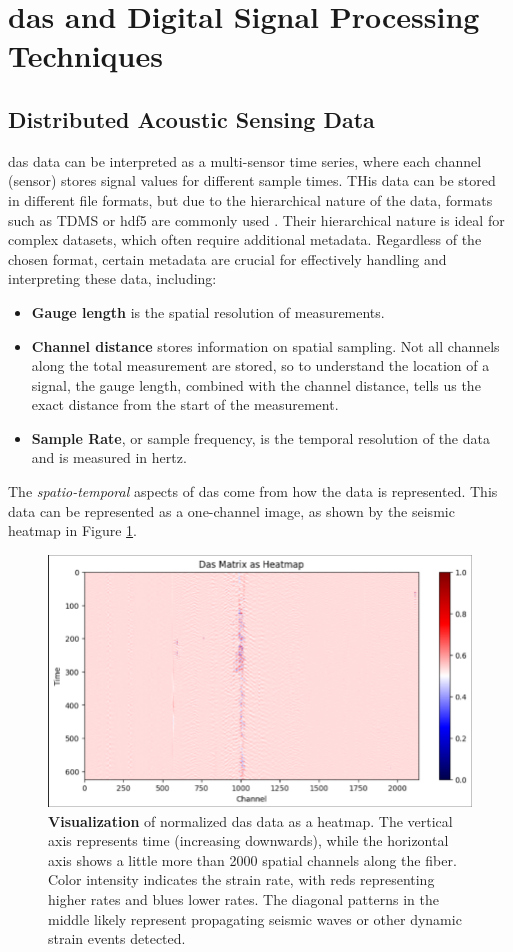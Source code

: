 \section{\acrshort{das} and Digital Signal Processing Techniques}
\label{back:dsp}

\subsection{Distributed Acoustic Sensing Data}
\label{back:das}

\acrshort{das} data can be interpreted as a multi-sensor time series, where each channel (sensor) stores signal values for different sample times. THis data can be stored in different file formats, but due to the hierarchical nature of the data, formats such as TDMS \cite{10.1145/800196.805973} or \acrshort{hdf5} \cite{koranne2011hierarchical} are commonly used \cite{spica2022pubdas}. Their hierarchical nature is ideal for complex datasets, which often require additional metadata. Regardless of the chosen format, certain metadata are crucial for effectively handling and interpreting these data, including:
\begin{itemize}
    \item \textbf{Gauge length} is the spatial resolution of measurements.
    \item \textbf{Channel distance} stores information on spatial sampling. Not all channels along the total measurement are stored, so to understand the location of a signal, the gauge length, combined with the channel distance, tells us the exact distance from the start of the measurement.
    \item \textbf{Sample Rate}, or sample frequency, is the temporal resolution of the data and is measured in hertz. 
\end{itemize}
%
The \textit{spatio-temporal} aspects of \acrshort{das} come from how the data is represented. This data can be represented as a one-channel image, as shown by the seismic heatmap in Figure \ref{fig:dasframe-ex}. 
%
\begin{figure}[!h]
    \centering
    \includegraphics[width=0.7\linewidth]{figures/das_example.png}
    \caption{\textbf{Visualization} of normalized \acrshort{das} data as a heatmap. The vertical axis represents time (increasing downwards), while the horizontal axis shows a little more than 2000 spatial channels along the fiber. Color intensity indicates the strain rate, with reds representing higher rates and blues lower rates. The diagonal patterns in the middle likely represent propagating seismic waves or other dynamic strain events detected.}
    \label{fig:dasframe-ex}
\end{figure}
%
